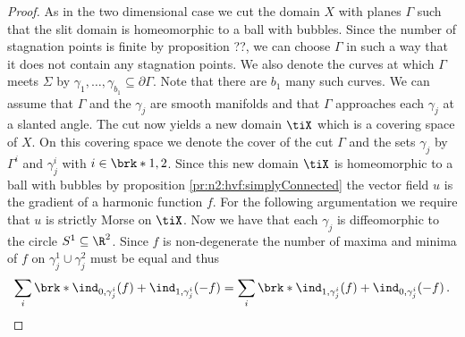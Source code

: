 \begin{proof}
  As in the two dimensional case we cut the domain $X$ with planes $\Gamma$ such that the slit domain is
  homeomorphic to a ball with bubbles.
  Since the number of stagnation points is finite by proposition ??, we can choose $\Gamma$ in such a way
  that it does not contain any stagnation points. We also denote the curves at which $\Gamma$ meets $\Sigma$ by 
  $\gamma_1,\dots,\gamma_{b_1}\subseteq\partial\Gamma$. Note that there are $b_1$ many such curves.
  We can assume that $\Gamma$ and the $\gamma_j$ are smooth manifolds and that $\Gamma$ approaches
  each $\gamma_j$ at a slanted angle.
  The cut now yields a new domain $\tiX$ which is a covering space of $X$.
  On this covering space we denote the cover of the cut $\Gamma$ and the sets $\gamma_j$ by
  $\Gamma^i$ and $\gamma_j^i$ with $i\in\brk*{1,2}$.
  Since this new domain $\tiX$ is homeomorphic to a ball with bubbles by proposition \ref{pr:n2:hvf:simplyConnected}
  the vector field $u$ is the gradient of a harmonic function $f$.
  For the following argumentation we require that $u$ is strictly Morse on $\tiX$.
  Now we have that each $\gamma_j$ is diffeomorphic to the circle $S^1\subseteq\R^2$.
  Since $f$ is non-degenerate the number of maxima and minima of $f$ on $\gamma_j^1\cup\gamma_j^2$ must be equal and thus
  \begin{align}
    \sum_i\brk*{\ind_{0,\gamma_j^i}(f)+\ind_{1,\gamma_j^i}(-f)}=\sum_i\brk*{\ind_{1,\gamma_j^i}(f)+\ind_{0,\gamma_j^i}(-f)}\,.
    \label{eq:n3_hvf_noInflowNoOutflow_maxMinRel}
  \end{align}


\end{proof}

